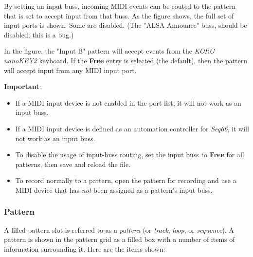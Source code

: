    By setting an input buss, incoming MIDI events can be routed to
   the pattern that is set to accept input from that buss.
   As the figure shows, the full set of input ports is shown.
   Some are disabled. (The "ALSA Announce" buss, should be disabled; this
   is a bug.)

   In the figure, the "Input B" pattern will accept events from
   the \textsl{KORG nanoKEY2} keyboard.
   If the \textbf{Free} entry is selected (the default), then
   the pattern will accept input from any MIDI input port.

   \textbf{Important}:
   \begin{itemize}
      \item If a MIDI input device is not enabled in the port list,
         it will not work as an input buss.
      \item If a MIDI input device is defined as an automation controller for
         \textsl{Seq66}, it will not work as an input buss.
      \item To disable the usage of input-buss routing, set the input buss
         to \textbf{Free} for all patterns, then save and reload the file.
      \item To record normally to a pattern, open the pattern for recording
         and use a MIDI device that has \textsl{not} been assigned as
         a pattern's input buss.
   \end{itemize}
   
\subsubsection{Pattern}
\label{subsubsec:patterns_pattern_filled}

   A filled pattern slot is referred to as a \textsl{pattern}
   (or \textsl{track}, \textsl{loop}, or \textsl{sequence}).
   A pattern is shown in the pattern grid as a filled box with a number of
   items of information surrounding it.  Here are the items shown:

